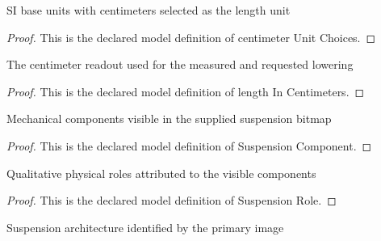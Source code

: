 \begin{definition}
  \label{def:physics:phyx-mini-0199:phyxminiproblems-problemphyxmini0199-centimeterunitchoices}
  SI base units with centimeters selected as the length unit
\end{definition}
\begin{proof}
  This is the declared model definition of centimeter Unit Choices.
\end{proof}
\begin{definition}
  \label{def:physics:phyx-mini-0199:phyxminiproblems-problemphyxmini0199-lengthincentimeters}
  The centimeter readout used for the measured and requested lowering
\end{definition}
\begin{proof}
  This is the declared model definition of length In Centimeters.
\end{proof}
\begin{definition}
  \label{def:physics:phyx-mini-0199:phyxminiproblems-problemphyxmini0199-suspensioncomponent}
  Mechanical components visible in the supplied suspension bitmap
\end{definition}
\begin{proof}
  This is the declared model definition of Suspension Component.
\end{proof}
\begin{definition}
  \label{def:physics:phyx-mini-0199:phyxminiproblems-problemphyxmini0199-suspensionrole}
  Qualitative physical roles attributed to the visible components
\end{definition}
\begin{proof}
  This is the declared model definition of Suspension Role.
\end{proof}
\begin{definition}
  \label{def:physics:phyx-mini-0199:phyxminiproblems-problemphyxmini0199-suspensionkind}
  Suspension architecture identified by the primary image
\end{definition}
